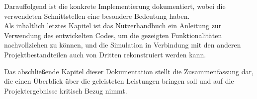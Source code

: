 	Darauffolgend ist die konkrete Implementierung dokumentiert, wobei die verwendeten Schnittstellen eine besondere Bedeutung haben.\\
	Als inhaltlich letztes Kapitel ist das Nutzerhandbuch ein Anleitung zur Verwendung des entwickelten Codes, um die gezeigten Funktionalitäten nachvollziehen zu können, und die Simulation in Verbindung mit den anderen Projektbestandteilen auch von Dritten rekonstruiert werden kann.
	
	Das abschließende Kapitel dieser Dokumentation stellt die Zusammenfassung dar, die einen Überblick über die geleisteten Leistungen bringen soll und auf die Projektergebnisse kritisch Bezug nimmt.
	